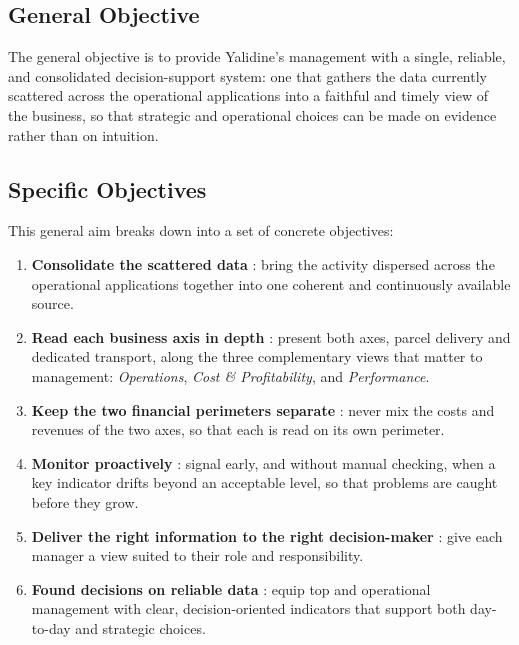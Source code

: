 \subsection{General Objective}

The general objective is to provide Yalidine's management with a single, reliable, and consolidated
decision-support system: one that gathers the data currently scattered across the operational
applications into a faithful and timely view of the business, so that strategic and operational
choices can be made on evidence rather than on intuition.

\subsection{Specific Objectives}

This general aim breaks down into a set of concrete objectives:

\begin{enumerate}[noitemsep, label=\textbf{\arabic*.}]
    \item \textbf{Consolidate the scattered data} : bring the activity dispersed across the
          operational applications together into one coherent and continuously available source.
    \item \textbf{Read each business axis in depth} : present both axes, parcel delivery and
          dedicated transport, along the three complementary views that matter to management:
          \emph{Operations}, \emph{Cost \& Profitability}, and \emph{Performance}.
    \item \textbf{Keep the two financial perimeters separate} : never mix the costs and revenues of
          the two axes, so that each is read on its own perimeter.
    \item \textbf{Monitor proactively} : signal early, and without manual checking, when a key
          indicator drifts beyond an acceptable level, so that problems are caught before they grow.
    \item \textbf{Deliver the right information to the right decision-maker} : give each manager a
          view suited to their role and responsibility.
    \item \textbf{Found decisions on reliable data} : equip top and operational management with
          clear, decision-oriented indicators that support both day-to-day and strategic choices.
\end{enumerate}

